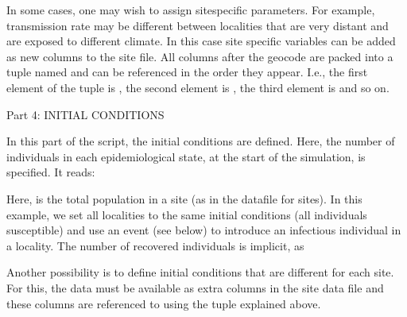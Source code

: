 \documentclass[letterpaper,10pt,english]{sphinxmanual}
\begin{document}
In some cases, one may wish to assign site\sphinxhyphen{}specific parameters. For example, transmission rate may be different between localities that are very distant and are exposed to different climate. In this case site specific variables can be added as new columns to the site file. All columns after the geocode are packed into a tuple named  and can be referenced in the order they appear. I.e., the first element of the tuple is , the second element is , the third element is  and so on.

Part 4: INITIAL CONDITIONS

In this part of the script, the initial conditions are defined. Here, the number of individuals in each epidemiological state, at the start of the simulation, is specified. It reads:

\begin{sphinxVerbatim}[commandchars=\\\{\}]
  
  
  
\end{sphinxVerbatim}

Here,  is the total population in a site (as in the datafile for sites). In this example, we set all localities to the same initial conditions (all individuals susceptible) and use an event (see below) to introduce an infectious individual in a locality. The number of recovered individuals is implicit, as 

Another possibility is to define initial conditions that are different for each site. For this, the data must be available as extra columns in the site data file and these columns are referenced to using the  tuple explained above.
\end{document}
